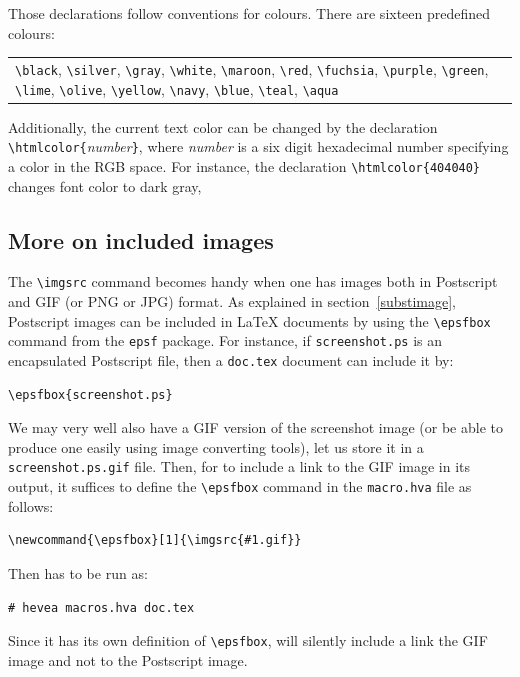 Those declarations follow \html{} conventions for colours.
There are sixteen predefined colours:
\begin{center}
\begin{tabular}{p{.7\linewidth}}
\verb+\black+,
\verb+\silver+,
\verb+\gray+,
\verb+\white+,
\verb+\maroon+,
\verb+\red+,
\verb+\fuchsia+,
\verb+\purple+,
\verb+\green+,
\verb+\lime+,
\verb+\olive+,
\verb+\yellow+,
\verb+\navy+,
\verb+\blue+,
\verb+\teal+,
\verb+\aqua+
\end{tabular}
\end{center}
Additionally, the current text color can be
changed by the declaration \verb+\htmlcolor{+{\it number}\verb+}+,
where {\it number} is a six digit hexadecimal number specifying a
color in the RGB space.  For instance, the declaration
\verb+\htmlcolor{404040}+
changes font color to dark gray,

\subsection{More on included\label{imgsrc} images}
The \verb+\imgsrc+ command becomes handy when one has images both in
Postscript and GIF (or PNG or JPG) format.  As explained in
section~\ref{substimage}, Postscript images can be included in
\LaTeX{} documents by using the \verb+\epsfbox+ command from the
\texttt{epsf} package.  For instance, if \texttt{screenshot.ps} is an
encapsulated Postscript file, then a \texttt{doc.tex} document can
include it by:
\begin{verbatim}
\epsfbox{screenshot.ps}
\end{verbatim}
We may very well also have a GIF version of the screenshot image
(or be able to produce one easily using image converting tools),
let us store it in a \texttt{screenshot.ps.gif} file.
Then, for \hevea{} to include a link to the GIF image in its
output, it suffices
to define the \verb+\epsfbox+ command in the \texttt{macro.hva} file
as follows:
\begin{verbatim}
\newcommand{\epsfbox}[1]{\imgsrc{#1.gif}}
\end{verbatim}
Then \hevea{} has to be run as:
\begin{verbatim}
# hevea macros.hva doc.tex
\end{verbatim}
Since it has its own definition of \verb+\epsfbox+, \hevea{} will
silently include a link the GIF image and not to the Postscript image.

